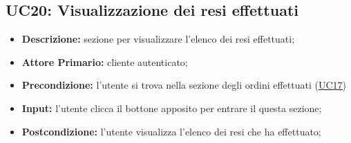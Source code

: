 \subsection{UC20: Visualizzazione dei resi effettuati}
\label{sec:UC20}
\begin{itemize}
    \item \textbf{Descrizione:} sezione per visualizzare l'elenco dei resi effettuati;
    \item \textbf{Attore Primario:} cliente autenticato;
    \item \textbf{Precondizione:} l'utente si trova nella sezione degli ordini effettuati (\hyperref[sec:UC17]{\underline{UC17}})
    \item \textbf{Input:} l'utente clicca il bottone apposito per entrare il questa sezione;
    \item \textbf{Postcondizione:} l'utente visualizza l'elenco dei resi che ha effettuato;
\end{itemize}